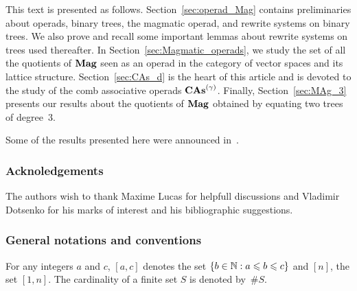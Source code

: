 This text is presented as follows. Section~\ref{sec:operad_Mag} contains
preliminaries about operads, binary trees, the magmatic operad, and
rewrite systems on binary trees. We also prove and recall some important
lemmas about rewrite systems on trees used thereafter. In
Section~\ref{sec:Magmatic_operads}, we study the set of all the
quotients of $\mathbf{Mag}$ seen as an operad in the category of vector spaces
and its lattice structure. Section~\ref{sec:CAs_d} is the heart of this
article and is devoted to the study of the comb associative operads
$\mathbf{CAs}^{\left(\gamma\right)}$. Finally, Section~\ref{sec:MAg_3} presents our results
about the quotients of $\mathbf{Mag}$ obtained by equating two trees of
degree~$3$.
\medbreak

Some of the results presented here were announced in~\cite{CCG18}.
\medbreak

\subsubsection*{Acknoledgements}
The authors wish to thank Maxime Lucas for helpfull discussions and
Vladimir Dotsenko for his marks of interest and his bibliographic
suggestions.
\medbreak

\subsubsection*{General notations and conventions}
For any integers $a$ and $c$, $[a, c]$ denotes the set
$\{b \in \mathbb{N} : a \leqslant b \leqslant c\}$ and $[n]$, the set $[1, n]$. The
cardinality of a finite set $S$ is denoted by~$\# S$.
\medbreak
